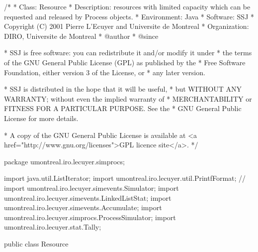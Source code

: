 \begin{code}
\begin{hide}
/*
 * Class:        Resource
 * Description:  resources with limited capacity which can be requested 
                 and released by Process objects.
 * Environment:  Java
 * Software:     SSJ 
 * Copyright (C) 2001  Pierre L'Ecuyer and Universite de Montreal
 * Organization: DIRO, Universite de Montreal
 * @author       
 * @since

 * SSJ is free software: you can redistribute it and/or modify it under
 * the terms of the GNU General Public License (GPL) as published by the
 * Free Software Foundation, either version 3 of the License, or
 * any later version.

 * SSJ is distributed in the hope that it will be useful,
 * but WITHOUT ANY WARRANTY; without even the implied warranty of
 * MERCHANTABILITY or FITNESS FOR A PARTICULAR PURPOSE.  See the
 * GNU General Public License for more details.

 * A copy of the GNU General Public License is available at
   <a href="http://www.gnu.org/licenses">GPL licence site</a>.
 */
\end{hide}
package umontreal.iro.lecuyer.simprocs;
\begin{hide}
import java.util.ListIterator;
import umontreal.iro.lecuyer.util.PrintfFormat;
// import umontreal.iro.lecuyer.simevents.Simulator;
import umontreal.iro.lecuyer.simevents.LinkedListStat;
import umontreal.iro.lecuyer.simevents.Accumulate;
import umontreal.iro.lecuyer.simprocs.ProcessSimulator;
import umontreal.iro.lecuyer.stat.Tally;
\end{hide}

public class Resource \begin{hide} {

   private static final int FIFO  = 1;
   private static final int LIFO  = 2;

        private ProcessSimulator sim;

        private String name;
        private int capacity = 0;
        private int available = 0;
        private int policy = FIFO;

        private LinkedListStat<UserRecord> serviceList;
        private LinkedListStat<UserRecord> waitingList;

        private boolean    stats = false;
        private double     initStatTime;
        private Accumulate statUtil;
        private Accumulate statCapacity;
        private Tally      statSojourn;
\end{hide}\end{code}


